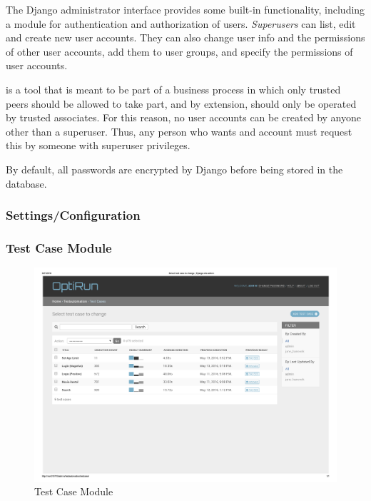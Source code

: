\noindent The Django administrator interface provides some built-in functionality, including a module for authentication and authorization of users. \emph{Superusers} can list, edit and create new user accounts. They can also change user info and the permissions of other user accounts, add them to user groups, and specify the permissions of user accounts.

\toolname \space is a tool that is meant to be part of a business process in which only trusted peers should be allowed to take part, and by extension, \toolname \space should only be operated by trusted associates. For this reason, no user accounts can be created by anyone other than a superuser. Thus, any person who wants and account must request this by someone with superuser privileges. 

By default, all passwords are encrypted by Django before being stored in the database.






\subsubsection{Settings/Configuration}







\subsubsection{Test Case Module}

\begin{figure}[h]
    \centering
    \includegraphics[width=\textwidth]{figures/test_cases.pdf}
    \caption{Test Case Module}
    \label{fig.tc_mod}
\end{figure}

